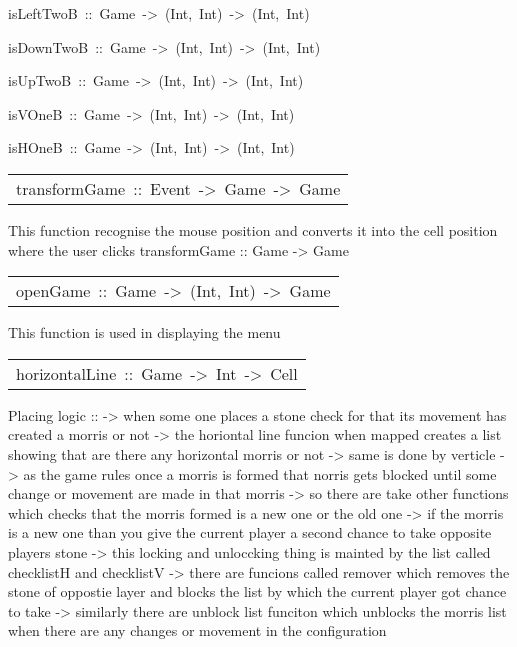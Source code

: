 \begin{haddockdesc}
\item[
isLeftTwoB\ ::\ Game\ ->\ (Int,\ Int)\ ->\ (Int,\ Int)
]
\item[
isDownTwoB\ ::\ Game\ ->\ (Int,\ Int)\ ->\ (Int,\ Int)
]
\item[
isUpTwoB\ ::\ Game\ ->\ (Int,\ Int)\ ->\ (Int,\ Int)
]
\item[
isVOneB\ ::\ Game\ ->\ (Int,\ Int)\ ->\ (Int,\ Int)
]
\item[
isHOneB\ ::\ Game\ ->\ (Int,\ Int)\ ->\ (Int,\ Int)
]
\end{haddockdesc}
\begin{haddockdesc}
\item[\begin{tabular}{@{}l}
transformGame\ ::\ Event\ ->\ Game\ ->\ Game
\end{tabular}]\haddockbegindoc
{}
 This function recognise the mouse position and converts it into the cell position where the user clicks
 transformGame :: Game -> Game\par

\end{haddockdesc}
\begin{haddockdesc}
\item[\begin{tabular}{@{}l}
openGame\ ::\ Game\ ->\ (Int,\ Int)\ ->\ Game
\end{tabular}]\haddockbegindoc
{}
 This function is used in displaying the menu\par

\end{haddockdesc}
\begin{haddockdesc}
\item[\begin{tabular}{@{}l}
horizontalLine\ ::\ Game\ ->\ {\char 91}Int{\char 93}\ ->\ Cell
\end{tabular}]\haddockbegindoc
Placing logic ::
 -> when some one places a stone check for that its movement has created a morris or not
 -> the horiontal line funcion when mapped creates a list showing that are there any horizontal morris or not
 -> same is done by verticle
 -> as the game rules once a morris is formed that norris gets blocked until some change or movement are made in that morris
 -> so there are take other functions which checks that the morris formed is a new one or the old one
 -> if the morris is a new one than you give the current player a second chance to take opposite players stone
 -> this locking and unloccking thing is mainted by the list called checklistH and checklistV
 -> there are funcions called remover which removes the stone of oppostie layer and blocks the list by which the current player got chance to take
 -> similarly there are unblock list funciton which unblocks the morris list when there are any changes or movement in the configuration\par

\end{haddockdesc}
